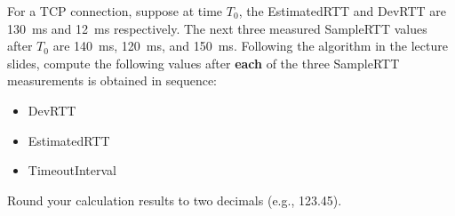\documentclass{report}
\begin{document}
\newpage
\begin{problem}
For a TCP connection, suppose at time $T_0$, the EstimatedRTT and DevRTT are 130~ms and 12~ms respectively.
The next three measured SampleRTT values after $T_0$ are 140~ms, 120~ms, and 150~ms.
Following the algorithm in the lecture slides, compute the following values after \textbf{each} of the three SampleRTT measurements is obtained in sequence:

\begin{itemize}
    \item DevRTT
    \item EstimatedRTT
    \item TimeoutInterval
\end{itemize}

Round your calculation results to two decimals (e.g., 123.45).
\medskip


\end{problem}
\end{document}

